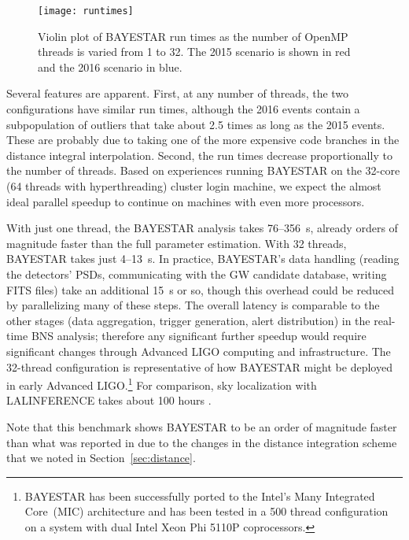 \documentclass[amsmath,amssymb,aps,prx,reprint,nopreprintnumbers,nofootinbib,showpacs]{revtex4-1}
\begin{document}
\begin{figure}
    \centering
    \texttt{[image: runtimes]}
    \caption[\acs{BAYESTAR} run time]{\label{fig:runtimes}Violin plot of \ac{BAYESTAR} run times as the number of OpenMP threads is varied from 1 to 32. The 2015 scenario is shown in red and the 2016 scenario in blue.}
\end{figure}

Several features are apparent. First, at any number of threads, the two configurations have similar run times, although the 2016 events contain a subpopulation of outliers that take about 2.5 times as long as the 2015 events. These are probably due to taking one of the more expensive code branches in the distance integral interpolation. Second, the run times decrease proportionally to the number of threads. Based on experiences running \ac{BAYESTAR} on the 32\nobreakdashes-core (64 threads with hyperthreading) cluster login machine, we expect the almost ideal parallel speedup to continue on machines with even more processors.

With just one thread, the \ac{BAYESTAR} analysis takes 76\nobreakdashes--356~s, already orders of magnitude faster than the full parameter estimation. With 32 threads, \ac{BAYESTAR} takes just 4\nobreakdashes--13~s. In practice, \ac{BAYESTAR}'s data handling (reading the detectors' \acp{PSD}, communicating with the \ac{GW} candidate database, writing FITS files) take an additional 15~s or so, though this overhead could be reduced by parallelizing many of these steps. The overall latency is comparable to the other stages (data aggregation, trigger generation, alert distribution) in the real\nobreakdashes-time \ac{BNS} analysis; therefore any significant further speedup would require significant changes through Advanced \acs{LIGO} computing and infrastructure. The 32\nobreakdashes-thread configuration is representative of how \ac{BAYESTAR} might be deployed in early Advanced \ac{LIGO}.\footnote{\ac{BAYESTAR} has been successfully ported to the Intel's Many Integrated Core~(MIC) architecture and has been tested in a 500 thread configuration on a system with dual Intel Xeon Phi 5110P coprocessors.} For comparison, sky localization with LALINFERENCE takes about 100 hours \cite{BerryLocalization}.

Note that this benchmark shows \ac{BAYESTAR} to be an order of magnitude faster than what was reported in \cite{leo-singer-thesis,BerryLocalization} due to the changes in the distance integration scheme that we noted in Section~\ref{sec:distance}.
\end{document}
